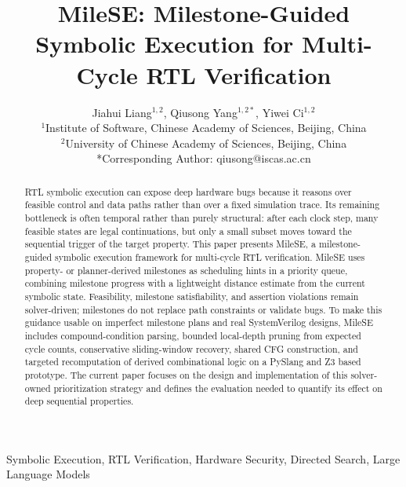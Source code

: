 \documentclass[conference]{IEEEtran}
\begin{document}
\title{MileSE: Milestone-Guided Symbolic Execution for Multi-Cycle RTL Verification}

\IEEEspecialpapernotice{\vspace{-2em}}
\author{
Jiahui Liang$^{1,2}$, Qiusong Yang$^{1,2*}$, Yiwei Ci$^{1,2}$ \\
$^{1}$Institute of Software, Chinese Academy of Sciences, Beijing, China \\
$^{2}$University of Chinese Academy of Sciences, Beijing, China \\
*Corresponding Author: qiusong@iscas.ac.cn
}
\IEEEaftertitletext{}

\maketitle

\begin{abstract}
RTL symbolic execution can expose deep hardware bugs because it reasons over feasible control and data paths rather than over a fixed simulation trace. Its remaining bottleneck is often temporal rather than purely structural: after each clock step, many feasible states are legal continuations, but only a small subset moves toward the sequential trigger of the target property. This paper presents MileSE, a milestone-guided symbolic execution framework for multi-cycle RTL verification. MileSE uses property- or planner-derived milestones as scheduling hints in a priority queue, combining milestone progress with a lightweight distance estimate from the current symbolic state. Feasibility, milestone satisfiability, and assertion violations remain solver-driven; milestones do not replace path constraints or validate bugs. To make this guidance usable on imperfect milestone plans and real SystemVerilog designs, MileSE includes compound-condition parsing, bounded local-depth pruning from expected cycle counts, conservative sliding-window recovery, shared CFG construction, and targeted recomputation of derived combinational logic on a PySlang and Z3 based prototype. The current paper focuses on the design and implementation of this solver-owned prioritization strategy and defines the evaluation needed to quantify its effect on deep sequential properties.
\end{abstract}

\begin{IEEEkeywords}
Symbolic Execution, RTL Verification, Hardware Security, Directed Search, Large Language Models
\end{IEEEkeywords}
\end{document}
